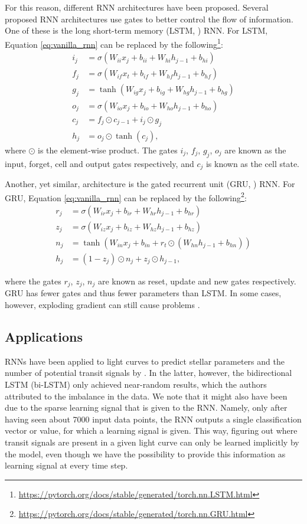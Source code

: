For this reason, different RNN architectures have been proposed. Several proposed RNN architectures use gates to better control the flow of information. One of these is the long short-term memory (LSTM, \cite{hochreiter1997long}) RNN. For LSTM, Equation \ref{eq:vanilla_rnn} can be replaced by the following\footnote{\url{https://pytorch.org/docs/stable/generated/torch.nn.LSTM.html}}: 
\begin{align}
    i_j &= \sigma(W_{ii}x_j + b_{ii} + W_{hi}h_{j-1} + b_{hi}) \\
    f_j &= \sigma(W_{if}x_t + b_{if} + W_{hf}h_{j-1} + b_{hf}) \\
    g_j &= \tanh(W_{ig}x_j + b_{ig} + W_{hg}h_{j-1} + b_{hg}) \\
    o_j &= \sigma(W_{io}x_j + b_{io} + W_{ho}h_{j-1} + b_{ho}) \\
    c_j &= f_j \odot c_{j-1} + i_j \odot g_j \\
    h_j &= o_j \odot \tanh(c_j),
\end{align}
where  $\odot$ is the element-wise product. The gates $i_j$, $f_j$, $g_j$, $o_j$ are known as the input, forget, cell and output gates respectively, and $c_j$ is known as the cell state. 

Another, yet similar, architecture is the gated recurrent unit (GRU, \cite{cho2014learning}) RNN. For GRU, Equation \ref{eq:vanilla_rnn} can be replaced by the following\footnote{\url{https://pytorch.org/docs/stable/generated/torch.nn.GRU.html}}:
\begin{align}
    r_j &= \sigma(W_{ir}x_j + b_{ir} + W_{hr}h_{j-1} + b_{hr}) \\
    z_j &= \sigma(W_{iz}x_j + b_{iz} + W_{hz}h_{j-1} + b_{hz}) \\   
    n_j &= \tanh(W_{in}x_j + b_{in} + r_t \odot (W_{hn}h_{j-1} + b_{hn})) \\
    h_j &= (1 - z_j) \odot n_j + z_j \odot h_{j-1},
\end{align}

\noindent where the gates $r_j$, $z_j$, $n_j$ are known as reset, update and new gates respectively. GRU has fewer gates and thus fewer parameters than LSTM. In some cases, however, exploding gradient can still cause problems \citep{kanai2017preventing}. 

\subsection{Applications}

RNNs have been applied to light curves to predict stellar parameters and the number of potential transit signals by \cite{hinners2018machine}. In the latter, however, the bidirectional LSTM (bi-LSTM) only achieved near-random results, which the authors attributed to the imbalance in the data. We note that it might also have been due to the sparse learning signal that is given to the RNN. Namely, only after having seen about 7000 input data points, the RNN outputs a single classification vector or value, for which a learning signal is given. This way, figuring out where transit signals are present in a given light curve can only be learned implicitly by the model, even though we have the possibility to provide this information as learning signal at every time step.

